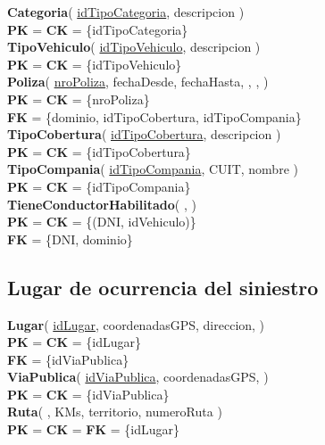 \textbf{Categoria}(
    \uline{idTipoCategoria},
    descripcion
)\\
\textbf{PK} = \textbf{CK} = \{idTipoCategoria\}\\

\textbf{TipoVehiculo}(
    \uline{idTipoVehiculo},
    descripcion
)\\
\textbf{PK} = \textbf{CK} = \{idTipoVehiculo\}\\

\textbf{Poliza}(
    \uline{nroPoliza},
    fechaDesde,
    fechaHasta,
    ,
    ,
)\\
\textbf{PK} = \textbf{CK} = \{nroPoliza\}\\
\textbf{FK} = \{dominio, idTipoCobertura, idTipoCompania\}\\

\textbf{TipoCobertura}(
    \uline{idTipoCobertura},
    descripcion
)\\
\textbf{PK} = \textbf{CK} = \{idTipoCobertura\}\\

\textbf{TipoCompania}(
    \uline{idTipoCompania},
    CUIT,
    nombre
)\\
\textbf{PK} = \textbf{CK} = \{idTipoCompania\}\\

\textbf{TieneConductorHabilitado}(
    \uline{},
    \uline{}
)\\
\textbf{PK} = \textbf{CK} = \{(DNI, idVehiculo)\}\\
\textbf{FK} = \{DNI, dominio\}



\subsection{Lugar de ocurrencia del siniestro}

\textbf{Lugar}(
    \uline{idLugar},
    coordenadasGPS,
    direccion,
)\\
\textbf{PK} = \textbf{CK} = \{idLugar\}\\
\textbf{FK} = \{idViaPublica\}\\

\textbf{ViaPublica}(
    \uline{idViaPublica},
    coordenadasGPS,
)\\
\textbf{PK} = \textbf{CK} = \{idViaPublica\}\\


\textbf{Ruta}(
    \uline{},
    KMs,
    territorio,
    numeroRuta
)\\
\textbf{PK} = \textbf{CK} = \textbf{FK} = \{idLugar\}\\

